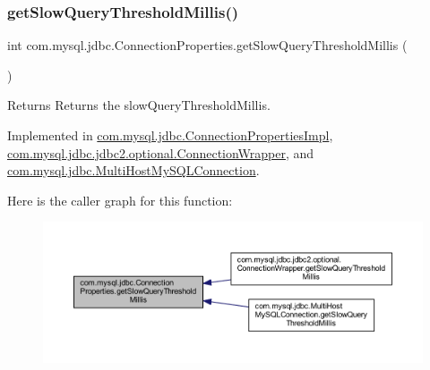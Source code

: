 \subsubsection{\texorpdfstring{get\+Slow\+Query\+Threshold\+Millis()}{getSlowQueryThresholdMillis()}}
{\footnotesize\ttfamily int com.\+mysql.\+jdbc.\+Connection\+Properties.\+get\+Slow\+Query\+Threshold\+Millis (\begin{DoxyParamCaption}{ }\end{DoxyParamCaption})}

\begin{DoxyReturn}{Returns}
Returns the slow\+Query\+Threshold\+Millis. 
\end{DoxyReturn}


Implemented in \mbox{\hyperlink{classcom_1_1mysql_1_1jdbc_1_1_connection_properties_impl_a44ae0735a78fd030465427632a56cd41}{com.\+mysql.\+jdbc.\+Connection\+Properties\+Impl}}, \mbox{\hyperlink{classcom_1_1mysql_1_1jdbc_1_1jdbc2_1_1optional_1_1_connection_wrapper_ae9a4a918bb9abd4ff539363763f49b25}{com.\+mysql.\+jdbc.\+jdbc2.\+optional.\+Connection\+Wrapper}}, and \mbox{\hyperlink{classcom_1_1mysql_1_1jdbc_1_1_multi_host_my_s_q_l_connection_a9ca9e74c9171ea4bed5d5218700ea951}{com.\+mysql.\+jdbc.\+Multi\+Host\+My\+S\+Q\+L\+Connection}}.

Here is the caller graph for this function\+:\nopagebreak
\begin{figure}[H]
\begin{center}
\leavevmode
\includegraphics[width=350pt]{interfacecom_1_1mysql_1_1jdbc_1_1_connection_properties_a6c2698e485ad9ad410bceff09e3835f0_icgraph}
\end{center}
\end{figure}
\mbox{\label{interfacecom_1_1mysql_1_1jdbc_1_1_connection_properties_a3bde53c87aba637f1e0833d504e96742}} 
